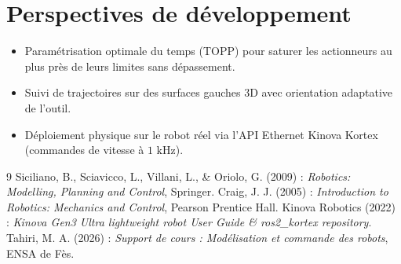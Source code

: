 \documentclass[11pt,a4paper]{report}
\begin{document}
\section{Perspectives de développement}
\begin{itemize}
    \item Paramétrisation optimale du temps (TOPP) pour saturer les actionneurs au plus près de leurs limites sans dépassement.
    \item Suivi de trajectoires sur des surfaces gauches 3D avec orientation adaptative de l'outil.
    \item Déploiement physique sur le robot réel via l'API Ethernet Kinova Kortex (commandes de vitesse à $1\text{ kHz}$).
\end{itemize}

\begin{thebibliography}{9}
     Siciliano, B., Sciavicco, L., Villani, L., \& Oriolo, G. (2009) : \textit{Robotics: Modelling, Planning and Control}, Springer.
     Craig, J. J. (2005) : \textit{Introduction to Robotics: Mechanics and Control}, Pearson Prentice Hall.
     Kinova Robotics (2022) : \textit{Kinova Gen3 Ultra lightweight robot User Guide \& ros2\_kortex repository}.
     Tahiri, M. A. (2026) : \textit{Support de cours : Modélisation et commande des robots}, ENSA de Fès.
\end{thebibliography}
\end{document}
